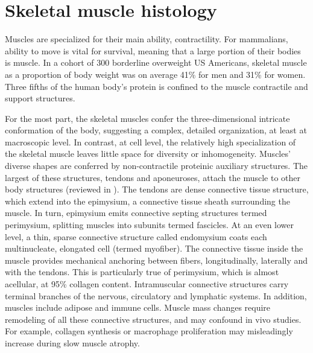 \documentclass[12pt,english]{report}\usepackage[]{graphicx}\usepackage[]{color}
\begin{document}
\section{Skeletal muscle histology}

Muscles are specialized for their main ability, contractility. For
mammalians, ability to move is vital for survival, meaning that a
large portion of their bodies is muscle. In a cohort of 300 borderline
overweight US Americans, skeletal muscle as a proportion of body weight
was on average 41\% for men and 31\% for women\citep{wang2003whole-body}.
Three fifths of the human body's protein is confined to the muscle
contractile and support structures\citep{santilli2014clinical}.

For the most part, the skeletal muscles confer the three-dimensional
intricate conformation of the body, suggesting a complex, detailed
organization, at least at macroscopic level. In contrast, at cell
level, the relatively high specialization of the skeletal muscle leaves
little space for diversity or inhomogeneity. Muscles' diverse shapes
are conferred by non-contractile proteinic auxiliary structures. The
largest of these structures, tendons and aponeuroses, attach the muscle
to other body structures (reviewed in \citep{mescher2013junqueiras}).
The tendons are dense connective tissue structure, which extend into
the epimysium, a connective tissue sheath surrounding the muscle.
In turn, epimysium emits connective septing structures termed perimysium,
splitting muscles into subunits termed fascicles. At an even lower
level, a thin, sparse connective structure called endomysium coats
each multinucleate, elongated cell (termed myofiber). The connective
tissue inside the muscle provides mechanical anchoring between fibers,
longitudinally, laterally and with the tendons. This is particularly
true of perimysium, which is almost acellular, at 95\% collagen content\citep{light1984characterization}.
Intramuscular connective structures carry terminal branches of the
nervous, circulatory and lymphatic systems. In addition, muscles include
adipose and immune cells. Muscle mass changes require remodeling of
all these connective structures, and may confound in vivo studies.
For example, collagen synthesis or macrophage proliferation may misleadingly
increase during slow muscle atrophy.
\end{document}
